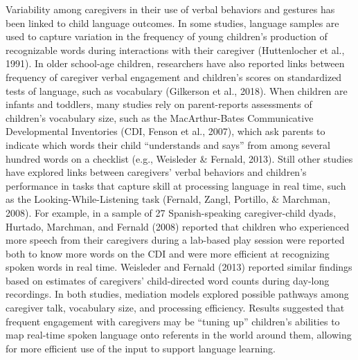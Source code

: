 \documentclass[
  man,mask,floatsintext]{apa6}
\begin{document}
Variability among caregivers in their use of verbal behaviors and gestures has been linked to child language outcomes. In some studies, language samples are used to capture variation in the frequency of young children's production of recognizable words during interactions with their caregiver (Huttenlocher et al., 1991). In older school-age children, researchers have also reported links between frequency of caregiver verbal engagement and children's scores on standardized tests of language, such as vocabulary (Gilkerson et al., 2018). When children are infants and toddlers, many studies rely on parent-reports assessments of children's vocabulary size, such as the MacArthur-Bates Communicative Developmental Inventories (CDI, Fenson et al., 2007), which ask parents to indicate which words their child ``understands and says'' from among several hundred words on a checklist (e.g., Weisleder \& Fernald, 2013). Still other studies have explored links between caregivers' verbal behaviors and children's performance in tasks that capture skill at processing language in real time, such as the Looking-While-Listening task (Fernald, Zangl, Portillo, \& Marchman, 2008). For example, in a sample of 27 Spanish-speaking caregiver-child dyads, Hurtado, Marchman, and Fernald (2008) reported that children who experienced more speech from their caregivers during a lab-based play session were reported both to know more words on the CDI and were more efficient at recognizing spoken words in real time. Weisleder and Fernald (2013) reported similar findings based on estimates of caregivers' child-directed word counts during day-long recordings. In both studies, mediation models explored possible pathways among caregiver talk, vocabulary size, and processing efficiency. Results suggested that frequent engagement with caregivers may be ``tuning up'' children's abilities to map real-time spoken language onto referents in the world around them, allowing for more efficient use of the input to support language learning.
\end{document}
